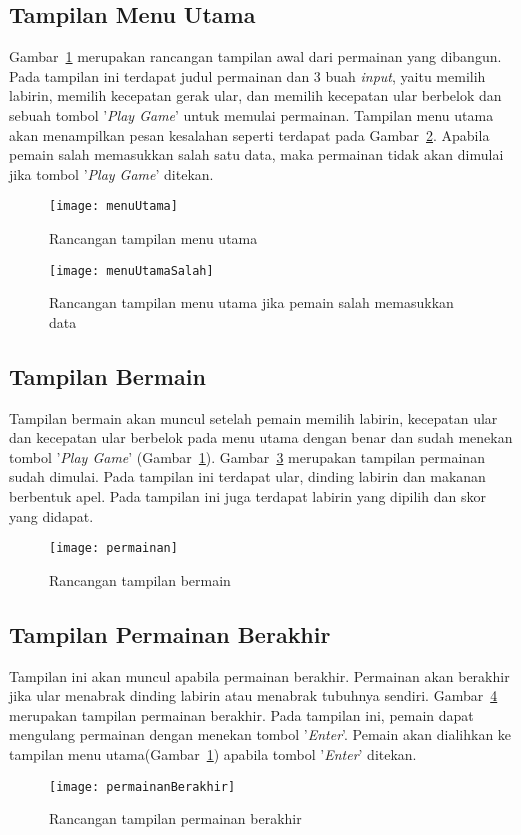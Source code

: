 \subsection{Tampilan Menu Utama}
Gambar~\ref{fig:menuUtama} merupakan rancangan tampilan awal dari permainan yang dibangun. Pada tampilan ini terdapat judul permainan dan 3 buah \textit{input}, yaitu memilih labirin, memilih kecepatan gerak ular, dan memilih kecepatan ular berbelok dan sebuah tombol '\textit{Play Game}' untuk memulai permainan. Tampilan menu utama akan menampilkan pesan kesalahan seperti terdapat pada Gambar~\ref{fig:menuUtamaSalah}. Apabila pemain salah memasukkan salah satu data, maka permainan tidak akan dimulai jika tombol '\textit{Play Game}' ditekan.

\begin{figure}[H]
	\centering  
	\texttt{[image: menuUtama]}  
	\caption[Rancangan tampilan menu utama]{Rancangan tampilan menu utama}
	\label{fig:menuUtama} 
\end{figure}

\begin{figure}[H]
	\centering  
	\texttt{[image: menuUtamaSalah]}  
	\caption[Rancangan tampilan menu utama jika pemain salah memasukkan data]{Rancangan tampilan menu utama jika pemain salah memasukkan data}
	\label{fig:menuUtamaSalah} 
\end{figure}

\subsection{Tampilan Bermain}
Tampilan bermain akan muncul setelah pemain memilih labirin, kecepatan ular dan kecepatan ular berbelok pada menu utama dengan benar dan sudah menekan tombol '\textit{Play Game}' (Gambar~\ref{fig:menuUtama}). Gambar~\ref{fig:permainan} merupakan tampilan permainan sudah dimulai. Pada tampilan ini terdapat ular, dinding labirin dan makanan berbentuk apel. Pada tampilan ini juga terdapat labirin yang dipilih dan skor yang didapat. 

\begin{figure}[H]
	\centering  
	\texttt{[image: permainan]}  
	\caption[Rancangan tampilan bermain]{Rancangan tampilan bermain}
	\label{fig:permainan} 
\end{figure}

\subsection{Tampilan Permainan Berakhir}
Tampilan ini akan muncul apabila permainan berakhir. Permainan akan berakhir jika ular menabrak dinding labirin atau menabrak tubuhnya sendiri. Gambar~\ref{fig:permainanBerakhir} merupakan tampilan permainan berakhir. Pada tampilan ini, pemain dapat mengulang permainan dengan menekan tombol '\textit{Enter}'. Pemain akan dialihkan ke tampilan menu utama(Gambar~\ref{fig:menuUtama}) apabila tombol '\textit{Enter}' ditekan.

\begin{figure}[H]
	\centering  
	\texttt{[image: permainanBerakhir]}  
	\caption[Rancangan tampilan permainan berakhir]{Rancangan tampilan permainan berakhir}
	\label{fig:permainanBerakhir} 
\end{figure}